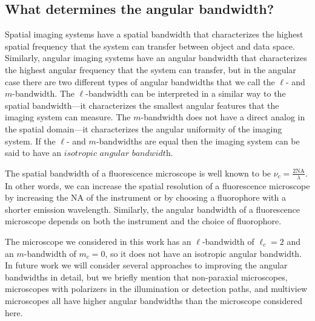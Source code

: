 \documentclass[]{osa-article}
\begin{document}



\subsection{What determines the angular bandwidth?}
Spatial imaging systems have a spatial bandwidth that characterizes the highest
spatial frequency that the system can transfer between object and data space.
Similarly, angular imaging systems have an angular bandwidth that characterizes
the highest angular frequency that the system can transfer, but in the angular case
there are two different types of angular bandwidths that we call the $\ell$- and
$m$-bandwidth. The $\ell$-bandwidth can be interpreted in a similar way to the
spatial bandwidth---it characterizes the smallest angular features that the
imaging system can measure. The $m$-bandwidth does not have a direct analog in
the spatial domain---it characterizes the angular uniformity of the imaging
system. If the $\ell$- and $m$-bandwidths are equal then the imaging system can
be said to have an $\textit{isotropic angular bandwidth}$.

The spatial bandwidth of a fluorescence microscope is well known to be
$\nu_c = \frac{2\text{NA}}{\lambda}$. In other words, we can increase the
spatial resolution of a fluorescence microscope by increasing the NA of the
instrument or by choosing a fluorophore with a shorter emission wavelength.
Similarly, the angular bandwidth of a fluorescence microscope depends on both
the instrument and the choice of fluorophore.

The microscope we considered in this work has an $\ell$-bandwidth of
$\ell_c = 2$ and an $m$-bandwidth of $m_c = 0$, so it does not have an isotropic
angular bandwidth. In future work we will consider several approaches to
improving the angular bandwidths in detail, but we briefly mention that
non-paraxial microscopes, microscopes with polarizers in the illumination or
detection paths, and multiview microscopes all have higher angular bandwidths
than the microscope considered here.
\end{document}
